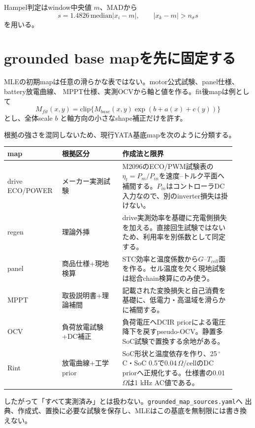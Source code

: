 Hampel判定はwindow中央値 $m$、MADから
\[
s=1.4826\,\mathrm{median}|x_i-m|,
\qquad |x_k-m|>n_\sigma s
\]
を用いる。


\section{grounded base mapを先に固定する}
MLEの初期mapは任意の滑らかな表ではない。motor公式試験、panel仕様、battery放電曲線、
MPPT仕様、実測OCVから軸と値を作る。fit後mapは例として
\[
M_{fit}(x,y)=\mathrm{clip}\{M_{base}(x,y)
\exp(b+a(x)+c(y))\}
\]
とし、全体scale $b$ と軸方向の小さなshape補正だけを許す。

根拠の強さを混同しないため、現行YATA基底mapを次のように分類する。

\begin{longtable}{p{0.20\linewidth}p{0.25\linewidth}p{0.47\linewidth}}
\toprule
map & 根拠区分 & 作成法と限界\\\midrule\endhead
drive ECO/POWER & メーカー実測試験 & M2096のECO/PWM試験表の$\eta_t=P_m/P_{in}$を速度--トルク平面へ補間する。$P_{in}$はコントローラDC入力なので、別のinverter損失は掛けない。\\
regen & 理論外挿 & drive実測効率を基礎に充電側損失を加える。直接回生試験ではないため、利用率を別係数として同定する。\\
panel & 商品仕様+現地検算 & STC効率と温度係数から$G$--$T_{cell}$面を作る。セル温度を欠く現地試験は総合chain検算にのみ使う。\\
MPPT & 取扱説明書+理論補間 & 記載された変換損失と自己消費を基礎に、低電力・高温域を滑らかに補間する。\\
OCV & 負荷放電試験+DC補正 & 負荷電圧へDCIR priorによる電圧降下を戻すpseudo-OCV。静置多SoC試験で置換する余地がある。\\
Rint & 放電曲線+工学prior & SoC形状と温度依存を作り、25\,$^\circ$C・SoC 0.5で0.04\,$\Omega$/cellのDC priorへ正規化する。仕様書の0.01\,$\Omega$は1 kHz AC値である。\\
\bottomrule
\end{longtable}

したがって「すべて実測済み」とは扱わない。\texttt{grounded\_map\_sources.yaml}へ
出典、作成式、置換に必要な試験を保存し、MLEはこの基底を無制限には書き換えない。


